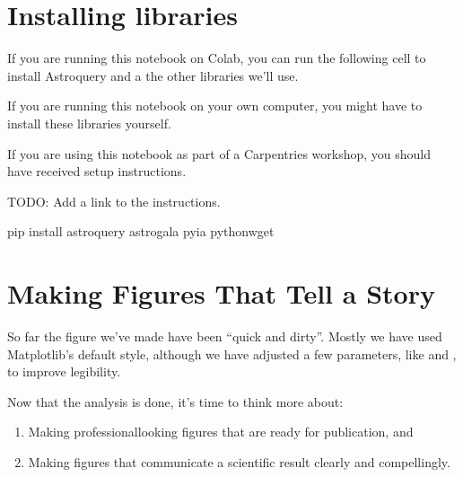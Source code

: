 \documentclass[letterpaper,10pt,english]{sphinxmanual}
\begin{document}
\section{Installing libraries}
\label{\detokenize{07_plot:installing-libraries}}
If you are running this notebook on Colab, you can run the following cell to install Astroquery and a the other libraries we’ll use.

If you are running this notebook on your own computer, you might have to install these libraries yourself.

If you are using this notebook as part of a Carpentries workshop, you should have received setup instructions.

TODO: Add a link to the instructions.

\begin{sphinxVerbatim}[commandchars=\\\{\}]

 
    

 
    pip install astroquery astro\PYGZhy{}gala pyia python\PYGZhy{}wget
\end{sphinxVerbatim}


\section{Making Figures That Tell a Story}
\label{\detokenize{07_plot:making-figures-that-tell-a-story}}
So far the figure we’ve made have been “quick and dirty”.  Mostly we have used Matplotlib’s default style, although we have adjusted a few parameters, like  and , to improve legibility.

Now that the analysis is done, it’s time to think more about:
\begin{enumerate}
%
\item {} 
Making professional\sphinxhyphen{}looking figures that are ready for publication, and

\item {} 
Making figures that communicate a scientific result clearly and compellingly.

\end{enumerate}
\end{document}
